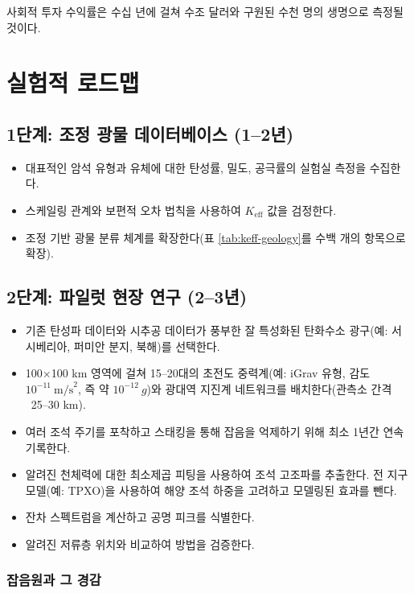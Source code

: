\documentclass[12pt,a4paper]{article}
\theoremstyle{remark}
\newcommand{\Keff}{K_{\mathrm{eff}}}
\begin{document}
	사회적 투자 수익률은 수십 년에 걸쳐 수조 달러와 구원된 수천 명의 생명으로 측정될 것이다.
	
	\section{실험적 로드맵}
	\label{sec:roadmap}
	
	\subsection{1단계: 조정 광물 데이터베이스 (1–2년)}
	
	\begin{itemize}
		\item 대표적인 암석 유형과 유체에 대한 탄성률, 밀도, 공극률의 실험실 측정을 수집한다.
		\item 스케일링 관계와 보편적 오차 법칙을 사용하여 \(\Keff\) 값을 검정한다.
		\item 조정 기반 광물 분류 체계를 확장한다(표 \ref{tab:keff-geology}를 수백 개의 항목으로 확장).
	\end{itemize}
	
	\subsection{2단계: 파일럿 현장 연구 (2–3년)}
	
	\begin{itemize}
		\item 기존 탄성파 데이터와 시추공 데이터가 풍부한 잘 특성화된 탄화수소 광구(예: 서시베리아, 퍼미안 분지, 북해)를 선택한다.
		\item 100×100 km 영역에 걸쳐 15–20대의 초전도 중력계(예: iGrav 유형, 감도 \(10^{-11}\ \text{m/s}^2\), 즉 약 \(10^{-12}\ g\))와 광대역 지진계 네트워크를 배치한다(관측소 간격 ~25–30 km).
		\item 여러 조석 주기를 포착하고 스태킹을 통해 잡음을 억제하기 위해 최소 1년간 연속 기록한다.
		\item 알려진 천체력에 대한 최소제곱 피팅을 사용하여 조석 고조파를 추출한다. 전 지구 모델(예: TPXO)을 사용하여 해양 조석 하중을 고려하고 모델링된 효과를 뺀다.
		\item 잔차 스펙트럼을 계산하고 공명 피크를 식별한다.
		\item 알려진 저류층 위치와 비교하여 방법을 검증한다.
	\end{itemize}
	
	\subsubsection{잡음원과 그 경감}
	
\end{document}
